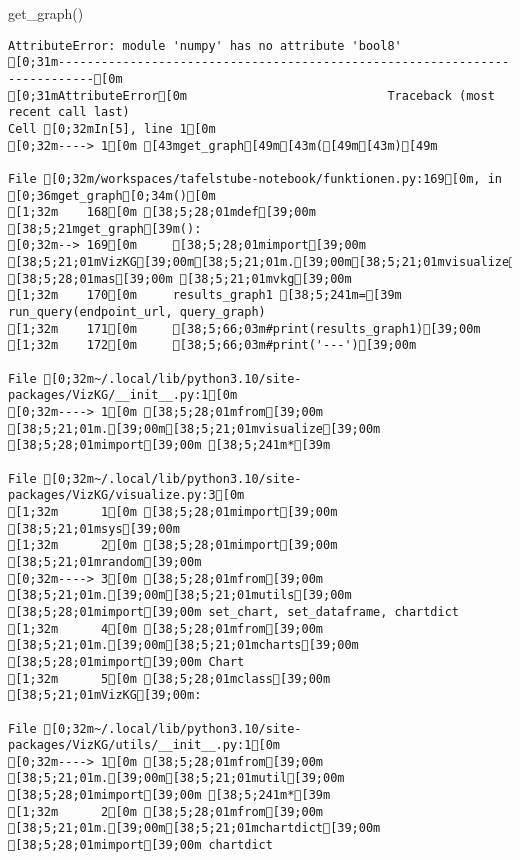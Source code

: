 \documentclass[
  a4paper,
  portrait]{book}
\newenvironment{Shaded}{\begin{snugshade}}{\end{snugshade}}
\newcommand{\NormalTok}[1]{\textcolor[rgb]{0.00,0.23,0.31}{#1}}
\begin{document}
\begin{Shaded}
\begin{Highlighting}[]
\NormalTok{get\_graph()}
\end{Highlighting}
\end{Shaded}

\begin{verbatim}
AttributeError: module 'numpy' has no attribute 'bool8'
[0;31m---------------------------------------------------------------------------[0m
[0;31mAttributeError[0m                            Traceback (most recent call last)
Cell [0;32mIn[5], line 1[0m
[0;32m----> 1[0m [43mget_graph[49m[43m([49m[43m)[49m

File [0;32m/workspaces/tafelstube-notebook/funktionen.py:169[0m, in [0;36mget_graph[0;34m()[0m
[1;32m    168[0m [38;5;28;01mdef[39;00m [38;5;21mget_graph[39m():
[0;32m--> 169[0m     [38;5;28;01mimport[39;00m [38;5;21;01mVizKG[39;00m[38;5;21;01m.[39;00m[38;5;21;01mvisualize[39;00m [38;5;28;01mas[39;00m [38;5;21;01mvkg[39;00m
[1;32m    170[0m     results_graph1 [38;5;241m=[39m run_query(endpoint_url, query_graph)
[1;32m    171[0m     [38;5;66;03m#print(results_graph1)[39;00m
[1;32m    172[0m     [38;5;66;03m#print('---')[39;00m

File [0;32m~/.local/lib/python3.10/site-packages/VizKG/__init__.py:1[0m
[0;32m----> 1[0m [38;5;28;01mfrom[39;00m [38;5;21;01m.[39;00m[38;5;21;01mvisualize[39;00m [38;5;28;01mimport[39;00m [38;5;241m*[39m

File [0;32m~/.local/lib/python3.10/site-packages/VizKG/visualize.py:3[0m
[1;32m      1[0m [38;5;28;01mimport[39;00m [38;5;21;01msys[39;00m
[1;32m      2[0m [38;5;28;01mimport[39;00m [38;5;21;01mrandom[39;00m
[0;32m----> 3[0m [38;5;28;01mfrom[39;00m [38;5;21;01m.[39;00m[38;5;21;01mutils[39;00m [38;5;28;01mimport[39;00m set_chart, set_dataframe, chartdict
[1;32m      4[0m [38;5;28;01mfrom[39;00m [38;5;21;01m.[39;00m[38;5;21;01mcharts[39;00m [38;5;28;01mimport[39;00m Chart
[1;32m      5[0m [38;5;28;01mclass[39;00m [38;5;21;01mVizKG[39;00m:

File [0;32m~/.local/lib/python3.10/site-packages/VizKG/utils/__init__.py:1[0m
[0;32m----> 1[0m [38;5;28;01mfrom[39;00m [38;5;21;01m.[39;00m[38;5;21;01mutil[39;00m [38;5;28;01mimport[39;00m [38;5;241m*[39m
[1;32m      2[0m [38;5;28;01mfrom[39;00m [38;5;21;01m.[39;00m[38;5;21;01mchartdict[39;00m [38;5;28;01mimport[39;00m chartdict


\end{verbatim}
\end{document}
